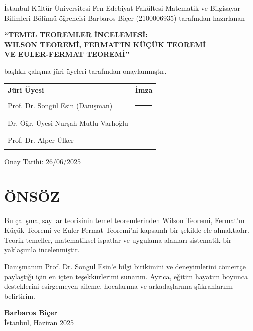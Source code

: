 \begin{minipage}{0.85\textwidth}
    \centering
    İstanbul Kültür Üniversitesi Fen-Edebiyat Fakültesi Matematik ve Bilgisayar Bilimleri Bölümü öğrencisi Barbaros Biçer (2100006935) tarafından hazırlanan
\end{minipage}

\vspace{1cm}
{\normalsize\bfseries ``TEMEL TEOREMLER İNCELEMESİ: \\ WILSON TEOREMİ, FERMAT'IN KÜÇÜK TEOREMİ \\ VE EULER-FERMAT TEOREMİ'' \par}
\vspace{1cm}

{\normalsize başlıklı çalışma jüri üyeleri tarafından onaylanmıştır. \par}
\vspace{1.5cm}

\begin{tabular}{p{9cm}p{5cm}}
    \hline
    \textbf{Jüri Üyesi} & \textbf{İmza} \\
    \hline
    Prof. Dr. Songül Esin (Danışman) & \rule{4cm}{0.4pt} \\
    Dr. Öğr. Üyesi Nurşah Mutlu Varlıoğlu & \rule{4cm}{0.4pt} \\
    Prof. Dr. Alper Ülker & \rule{4cm}{0.4pt} \\
    \hline
\end{tabular}

\vspace{2cm}
{\normalsize Onay Tarihi: 26/06/2025 \par}

\clearpage
\section*{ÖNSÖZ}
\vspace{1cm}
Bu çalışma, sayılar teorisinin temel teoremlerinden Wilson Teoremi, Fermat'ın Küçük Teoremi ve Euler-Fermat Teoremi'ni kapsamlı bir şekilde ele almaktadır. Teorik temeller, matematiksel ispatlar ve uygulama alanları sistematik bir yaklaşımla incelenmiştir.

Danışmanım Prof. Dr. Songül Esin'e bilgi birikimini ve deneyimlerini cömertçe paylaştığı için en içten teşekkürlerimi sunarım. Ayrıca, eğitim hayatım boyunca desteklerini esirgemeyen aileme, hocalarıma ve arkadaşlarıma şükranlarımı belirtirim.

\vspace{2cm}
\begin{flushright}
    \textbf{Barbaros Biçer} \\
    İstanbul, Haziran 2025
\end{flushright}

